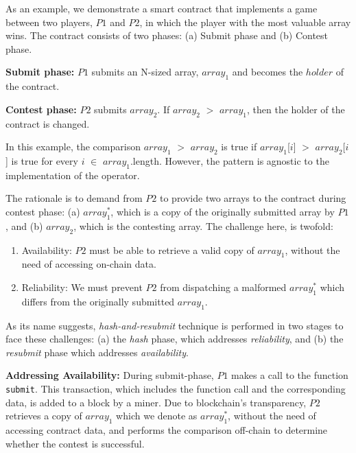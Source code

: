

As an example, we demonstrate a smart contract that implements a game between
two players, $P1$ and $P2$, in which the player with the most valuable array
wins. The contract consists of two phases: (a) Submit phase and (b) Contest
phase.

\noindent \textbf{Submit
phase:} $P1$ submits an N-sized array, $array_1$ and becomes the
$holder$ of the contract.

\noindent \textbf{Contest phase:} $P2$ submits $array_2$. If $array_2$ $>$
$array_1$, then the holder of the contract is changed.

In this example, the comparison $array_1$ $>$ $array_2$ is true if
$array_1$[$i$] $>$ $array_2$[$i$] is true for every $i$ $\in$ $array_1$.length.
However, the pattern is agnostic to the implementation of the operator.

The rationale is to demand from $P2$ to provide two arrays to the contract
during contest phase: (a) $array_1^*$, which is a copy of the
originally submitted array by $P1$, and (b) $array_2$, which is the
contesting array. The challenge here, is twofold:

\begin{enumerate}

    \item Availability: $P2$ must be able to retrieve a valid copy of
        $array_1$, without the need of accessing on-chain data.

    \item Reliability: We must prevent $P2$ from dispatching a malformed
        $array_1^*$ which differs from the originally submitted $array_1$.

\end{enumerate}

As its name suggests, \emph{hash-and-resubmit} technique is performed in two
stages to face these challenges: (a) the \emph{hash} phase, which addresses
\emph{reliability}, and (b) the \emph{resubmit} phase which addresses
\emph{availability}.

\noindent
\textbf{Addressing Availability:} During submit-phase, $P1$ makes a call to the
function \texttt{submit}. This transaction, which includes the function call
and the corresponding data, is added to a block by a miner. Due to blockchain's
transparency, $P2$  retrieves a copy of $array_1$ which we denote as
$array_1^*$, without the need of accessing contract data, and performs the
comparison off-chain to determine whether the contest is successful.

